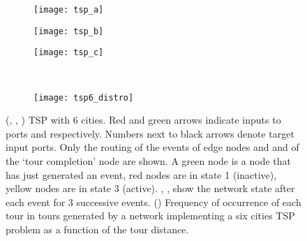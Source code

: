 \documentclass[10pt]{article}
\begin{document}
\begin{figure}[h]
 \centering
 \begin{subfigure}[b]{0.3\textwidth}
     \texttt{[image: tsp\_a]} 
     \subcaption{}
     \label{fig:tsp_a}
   \end{subfigure}
   \quad
   \begin{subfigure}[b]{0.3\textwidth}
     \texttt{[image: tsp\_b]} 
     \subcaption{}
     \label{fig:tsp_b}
   \end{subfigure}
   \quad
   \begin{subfigure}[b]{0.3\textwidth}
     \texttt{[image: tsp\_c]} 
     \subcaption{}
     \label{fig:tsp_c}
   \end{subfigure} \\

   \begin{subfigure}[b]{0.5\textwidth}
     \texttt{[image: tsp6\_distro]} 
     \subcaption{}
     \label{fig:tsp_d}
   \end{subfigure} 



   \caption{(, , ) TSP with 6 cities. Red and green arrows indicate inputs to ports  and  respectively. Numbers next to black arrows denote target input ports. Only the routing of the events of edge nodes  and  and of the `tour completion' node are shown. A green node is a node that has just generated an event, red nodes are in state 1 (inactive), yellow nodes are in state 3 (active). , ,  show the network state after each event for 3 successive events.  () Frequency of occurrence of each tour in  tours generated by a network implementing a six cities TSP problem as a function of the tour distance.}
\label{fig:tsp}
\end{figure}	
\end{document}

